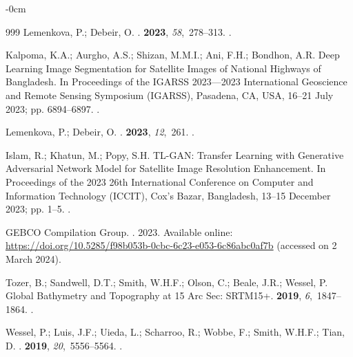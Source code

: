 \documentclass[water,article,accept,pdftex,oneauhor]{Definitions/mdpi}
\begin{document}
{{{\begin{adjustwidth}{-\extralength}{0cm}
\begin{thebibliography}{999}
Lemenkova, P.; Debeir, O.
.
 {\bf 2023}, {\em 58},~278--313.
.

Kalpoma, K.A.; Aurgho, A.S.; Shizan, M.M.I.; Ani, F.H.; Bondhon, A.R.
\newblock Deep Learning Image Segmentation for Satellite Images of National
  Highways of Bangladesh.
\newblock In Proceedings of the IGARSS 2023---2023 International Geoscience and Remote Sensing Symposium
  (IGARSS), Pasadena, CA, USA,  16--21 July 2023; pp. 6894--6897.
.

Lemenkova, P.; Debeir, O.
.
 {\bf 2023}, {\em 12},~261.
.

Islam, R.; Khatun, M.; Popy, S.H.
\newblock TL-GAN: Transfer Learning with Generative Adversarial Network Model
  for Satellite Image Resolution Enhancement.
\newblock In Proceedings of the 2023 26th International Conference on Computer
  and Information Technology (ICCIT), Cox's Bazar, Bangladesh, 13--15 December  2023; pp. 1--5.
.

{GEBCO Compilation Group}.
. 2023.
\newblock Available online:  
\newblock 
  {\url{https://doi.org/10.5285/f98b053b-0cbc-6c23-e053-6c86abc0af7b}} (accessed on 2 March 2024).

Tozer, B.; Sandwell, D.T.; Smith, W.H.F.; Olson, C.; Beale, J.R.; Wessel, P.
\newblock Global Bathymetry and Topography at 15 Arc Sec: SRTM15+.
 {\bf 2019}, {\em 6},~1847--1864.
.

Wessel, P.; Luis, J.F.; Uieda, L.; Scharroo, R.; Wobbe, F.; Smith, W.H.F.;
  Tian, D.
.
 {\bf 2019}, {\em 20},~5556--5564.
.


\end{thebibliography}
\end{adjustwidth}}}}
\end{document}
